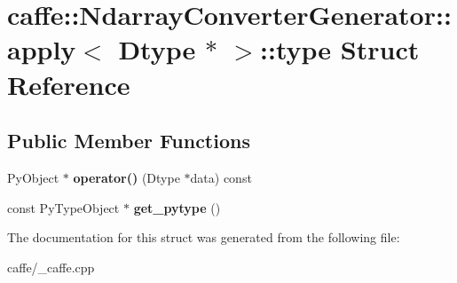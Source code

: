 \hypertarget{structcaffe_1_1_ndarray_converter_generator_1_1apply_3_01_dtype_01_5_01_4_1_1type}{}\section{caffe\+:\+:Ndarray\+Converter\+Generator\+:\+:apply$<$ Dtype $\ast$ $>$\+:\+:type Struct Reference}
\label{structcaffe_1_1_ndarray_converter_generator_1_1apply_3_01_dtype_01_5_01_4_1_1type}
\subsection*{Public Member Functions}
\begin{DoxyCompactItemize}
\item 
\hypertarget{structcaffe_1_1_ndarray_converter_generator_1_1apply_3_01_dtype_01_5_01_4_1_1type_a0be441e5e672c9039e91a58134d84c17}{}Py\+Object $\ast$ {\bfseries operator()} (Dtype $\ast$data) const \label{structcaffe_1_1_ndarray_converter_generator_1_1apply_3_01_dtype_01_5_01_4_1_1type_a0be441e5e672c9039e91a58134d84c17}

\item 
\hypertarget{structcaffe_1_1_ndarray_converter_generator_1_1apply_3_01_dtype_01_5_01_4_1_1type_a2458630718ae7c36deedeae759aacb92}{}const Py\+Type\+Object $\ast$ {\bfseries get\+\_\+pytype} ()\label{structcaffe_1_1_ndarray_converter_generator_1_1apply_3_01_dtype_01_5_01_4_1_1type_a2458630718ae7c36deedeae759aacb92}

\end{DoxyCompactItemize}


The documentation for this struct was generated from the following file\+:\begin{DoxyCompactItemize}
\item 
caffe/\+\_\+caffe.\+cpp\end{DoxyCompactItemize}

